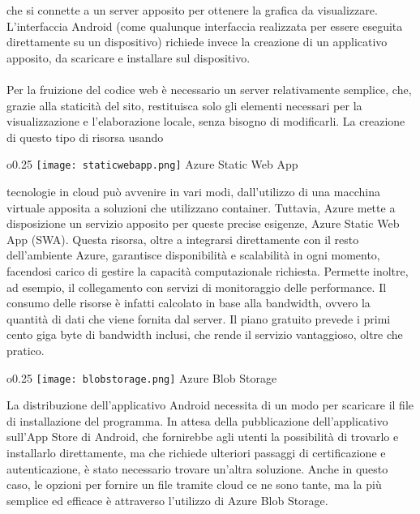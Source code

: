che si connette a un server apposito
per ottenere la grafica da visualizzare.
L'interfaccia Android 
(come qualunque interfaccia realizzata per essere eseguita direttamente su un dispositivo)
richiede invece la creazione di un applicativo apposito,
da scaricare e installare sul dispositivo.\\
\\
Per la fruizione del codice web è necessario un server relativamente semplice,
che, grazie alla staticità del sito,
restituisca solo gli elementi necessari per la visualizzazione e l'elaborazione locale,
senza bisogno di modificarli.
La creazione di questo tipo di risorsa usando
\begin{wrapfigure}{o}{0.25\textwidth}
    \centering
    \texttt{[image: staticwebapp.png]}
    Azure Static Web App
\end{wrapfigure}
tecnologie in cloud può avvenire in vari modi,
dall'utilizzo di una macchina virtuale apposita
a soluzioni che utilizzano container.
Tuttavia, Azure mette a disposizione un servizio apposito per queste precise esigenze,
Azure Static Web App (SWA).\newline
Questa risorsa, 
oltre a integrarsi direttamente con il resto dell'ambiente Azure,
garantisce disponibilità e scalabilità in ogni momento,
facendosi carico di gestire la capacità computazionale richiesta.
Permette inoltre, ad esempio, 
il collegamento con servizi di monitoraggio delle performance.
Il consumo delle risorse è infatti calcolato in base alla bandwidth,
ovvero la quantità di dati che viene fornita dal server.
Il piano gratuito prevede i primi cento giga byte di bandwidth inclusi,
che rende il servizio vantaggioso, oltre che pratico.\newline
\par
\begin{wrapfigure}{o}{0.25\textwidth}
    \centering
    \texttt{[image: blobstorage.png]}
    Azure Blob Storage
\end{wrapfigure}
La distribuzione dell'applicativo Android
necessita di un modo per scaricare il file di installazione del programma.
In attesa della pubblicazione dell'applicativo sull'App Store di Android,
che fornirebbe agli utenti la possibilità di trovarlo e installarlo direttamente,
ma che richiede ulteriori passaggi di certificazione e autenticazione,
è stato necessario trovare un'altra soluzione.
Anche in questo caso,
le opzioni per fornire un file tramite cloud ce ne sono tante,
ma la più semplice ed efficace è attraverso l'utilizzo di Azure Blob Storage.\\
